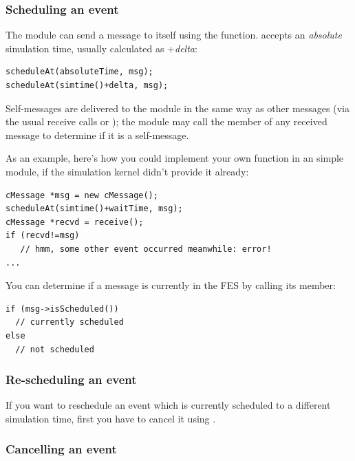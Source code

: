 \subsubsection{Scheduling an event}

The module can send a message to itself using the  function.
 accepts an \textit{absolute} simulation time,
usually calculated as +\textit{delta}:

\begin{verbatim}
scheduleAt(absoluteTime, msg);
scheduleAt(simtime()+delta, msg);
\end{verbatim}

Self-messages are delivered to the module in the same way as other
messages (via the usual receive calls or );
the module may call the  member of any received
message to determine if it is a self-message.

As an example, here's how you could implement your own 
function in an  simple module, if the simulation kernel
didn't provide it already:

%
%

\begin{verbatim}
cMessage *msg = new cMessage();
scheduleAt(simtime()+waitTime, msg);
cMessage *recvd = receive();
if (recvd!=msg)
   // hmm, some other event occurred meanwhile: error!
...
\end{verbatim}

You can determine if a message is currently in the FES
by calling its  member:

\begin{verbatim}
if (msg->isScheduled())
  // currently scheduled
else
  // not scheduled
\end{verbatim}


\subsubsection{Re-scheduling an event}

If you want to reschedule an event which is currently scheduled to a different
simulation time, first you have to cancel it using .


\subsubsection{Cancelling an event}

